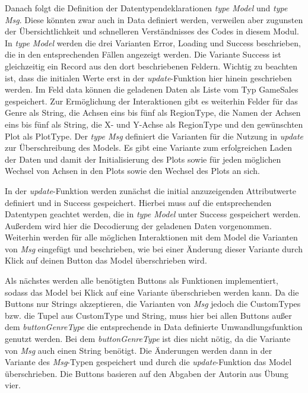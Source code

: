 \documentclass[usegeometry=true]{scrartcl}
\begin{document}
Danach folgt die Definition der Datentypendeklarationen \textit{type Model} und \textit{type Msg}. 
Diese könnten zwar auch in Data definiert werden, verweilen aber zugunsten der Übersichtlichkeit und schnelleren Verständnisses des Codes in diesem Modul.
In \textit{type Model} werden die drei Varianten Error, Loading und Success beschrieben, die in den entsprechenden Fällen angezeigt werden. 
Die Variante Success ist gleichzeitig ein Record aus den dort beschriebenen Feldern. 
Wichtig zu beachten ist, dass die initialen Werte erst in der \textit{update}-Funktion hier hinein geschrieben werden.
Im Feld data können die geladenen Daten als Liste vom Typ GameSales gespeichert. 
Zur Ermöglichung der Interaktionen gibt es weiterhin Felder für das Genre als String, die Achsen eins bis fünf als RegionType, die Namen der Achsen eins bis fünf als String, die X- und Y-Achse als RegionType und den gewünschten Plot als PlotType.
Der \textit{type Msg} definiert die Varianten für die Nutzung in \textit{update} zur Überschreibung des Models. 
Es gibt eine Variante zum erfolgreichen Laden der Daten und damit der Initialisierung des Plots sowie für jeden möglichen Wechsel von Achsen in den Plots sowie den Wechsel des Plots an sich.

In der \textit{update}-Funktion werden zunächst die initial anzuzeigenden Attributwerte definiert und in Success gespeichert. 
Hierbei muss auf die entsprechenden Datentypen geachtet werden, die in \textit{type Model} unter Success gespeichert werden. 
Außerdem wird hier die Decodierung der geladenen Daten vorgenommen. 
Weiterhin werden für alle möglichen Interaktionen mit dem Model die Varianten von \textit{Msg} eingefügt und beschrieben, wie bei einer Änderung dieser Variante durch Klick auf deinen Button das Model überschrieben wird.

Als nächstes werden alle benötigten Buttons als Funktionen implementiert, sodass das Model bei Klick auf eine Variante überschrieben werden kann. 
Da die Buttons nur Strings akzeptieren, die Varianten von \textit{Msg} jedoch die CustomTypes bzw. die Tupel aus CustomType und String, muss hier bei allen Buttons außer dem \textit{buttonGenreType} die entsprechende in Data definierte Umwandlungsfunktion genutzt werden. 
Bei dem \textit{buttonGenreType} ist dies nicht nötig, da die Variante von \textit{Msg} auch einen String benötigt.
Die Änderungen werden dann in der Variante des \textit{Msg}-Typen gespeichert und durch die \textit{update}-Funktion das Model überschrieben.
Die Buttons basieren auf den Abgaben der Autorin aus Übung vier.
\end{document}

